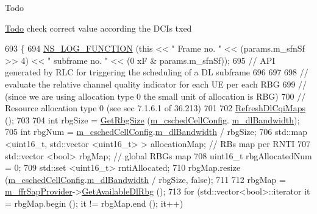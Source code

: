 \begin{DoxyRefDesc}{Todo}
\item[\hyperlink{todo__todo000137}{Todo}]check correct value according the D\+C\+Is txed \end{DoxyRefDesc}

\begin{DoxyCode}
693 \{
694   \hyperlink{log-macros-disabled_8h_a90b90d5bad1f39cb1b64923ea94c0761}{NS\_LOG\_FUNCTION} (\textcolor{keyword}{this} << \textcolor{stringliteral}{" Frame no. "} << (params.m\_sfnSf >> 4) << \textcolor{stringliteral}{" subframe no. "} << (0
      xF & params.m\_sfnSf));
695   \textcolor{comment}{// API generated by RLC for triggering the scheduling of a DL subframe}
696 
697 
698   \textcolor{comment}{// evaluate the relative channel quality indicator for each UE per each RBG}
699   \textcolor{comment}{// (since we are using allocation type 0 the small unit of allocation is RBG)}
700   \textcolor{comment}{// Resource allocation type 0 (see sec 7.1.6.1 of 36.213)}
701 
702   \hyperlink{classns3_1_1TdTbfqFfMacScheduler_ae5c88a5647201a5b882922a950832104}{RefreshDlCqiMaps} ();
703 
704   \textcolor{keywordtype}{int} rbgSize = \hyperlink{classns3_1_1TdTbfqFfMacScheduler_a66bac32b64401c51a50b7f554028f78e}{GetRbgSize} (\hyperlink{classns3_1_1TdTbfqFfMacScheduler_a3ac3e4b1b3818ff204d6ff6c89c19f4d}{m\_cschedCellConfig}.
      \hyperlink{structns3_1_1FfMacCschedSapProvider_1_1CschedCellConfigReqParameters_ad18c695bd3c9d7f742ba1dab4a941e8a}{m\_dlBandwidth});
705   \textcolor{keywordtype}{int} rbgNum = \hyperlink{classns3_1_1TdTbfqFfMacScheduler_a3ac3e4b1b3818ff204d6ff6c89c19f4d}{m\_cschedCellConfig}.\hyperlink{structns3_1_1FfMacCschedSapProvider_1_1CschedCellConfigReqParameters_ad18c695bd3c9d7f742ba1dab4a941e8a}{m\_dlBandwidth} / rbgSize;
706   std::map <uint16\_t, std::vector <uint16\_t> > allocationMap; \textcolor{comment}{// RBs map per RNTI}
707   std::vector <bool> rbgMap;  \textcolor{comment}{// global RBGs map}
708   uint16\_t rbgAllocatedNum = 0;
709   std::set <uint16\_t> rntiAllocated;
710   rbgMap.resize (\hyperlink{classns3_1_1TdTbfqFfMacScheduler_a3ac3e4b1b3818ff204d6ff6c89c19f4d}{m\_cschedCellConfig}.\hyperlink{structns3_1_1FfMacCschedSapProvider_1_1CschedCellConfigReqParameters_ad18c695bd3c9d7f742ba1dab4a941e8a}{m\_dlBandwidth} / rbgSize, \textcolor{keyword}{false});
711 
712   rbgMap = \hyperlink{classns3_1_1TdTbfqFfMacScheduler_a9db8ce15b6803fe859e5c2908cd00e14}{m\_ffrSapProvider}->\hyperlink{classns3_1_1LteFfrSapProvider_ad60306dae43b74dc25b65f81d6587a24}{GetAvailableDlRbg} ();
713   \textcolor{keywordflow}{for} (std::vector<bool>::iterator it = rbgMap.begin (); it != rbgMap.end (); it++)

\end{DoxyCode}
